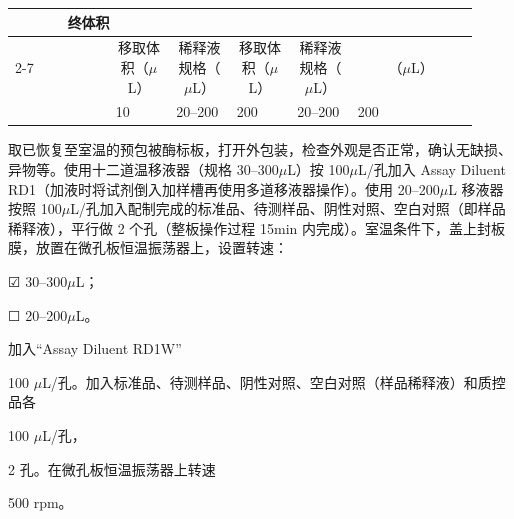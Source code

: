 \documentclass[UTF8,10pt,a4paper,fontset=fandol]{ctexart}
\newcommand{\fieldvalue}[1]{#1}
\newcommand{\handwritten}[1]{#1}
\newcommand{\checkboxfield}[1]{\ifstrequal{#1}{checked}{☑}{\ifstrequal{#1}{unclear}{?}{☐}}}
\begin{document}
\begin{tabular}{|p{0.20\linewidth}|p{0.12\linewidth}|p{0.12\linewidth}|p{0.12\linewidth}|p{0.12\linewidth}|p{0.12\linewidth}|p{0.12\linewidth}|}
\multicolumn{2}{c|}{终体积} \\
\cline{2-7}
 & \multicolumn{1}{c|}{移取体积（$\mu$L）} &
 \multicolumn{1}{c|}{稀释液规格（$\mu$L）} &
 \multicolumn{1}{c|}{移取体积（$\mu$L）} &
 \multicolumn{1}{c|}{稀释液规格（$\mu$L）} &
 \multicolumn{2}{c|}{（$\mu$L）} \\
\hline
 &
\fieldvalue{\handwritten{10}} &
\fieldvalue{\handwritten{20--200}} &
\fieldvalue{\handwritten{200}} &
\fieldvalue{\handwritten{20--200}} &
\fieldvalue{\handwritten{200}} &
\\
\hline
\end{tabular}

\vspace{2mm}

\noindent
取已恢复至室温的预包被酶标板，打开外包装，检查外观是否正常，确认无缺损、异物等。使用十二道温移液器（规格 30--300$\mu$L）按 100$\mu$L/孔加入 Assay Diluent RD1（加液时将试剂倒入加样槽再使用多道移液器操作）。使用 20--200$\mu$L 移液器按照 100$\mu$L/孔加入配制完成的标准品、待测样品、阴性对照、空白对照（即样品稀释液），平行做 2 个孔（整板操作过程 15min 内完成）。室温条件下，盖上封板膜，放置在微孔板恒温振荡器上，设置转速：

\fieldvalue{\checkboxfield{checked}} 30--300$\mu$L；

\fieldvalue{\checkboxfield{unchecked}} 20--200$\mu$L。

\vspace{1mm}

\noindent
加入“Assay Diluent RD1W”

\fieldvalue{\handwritten{100}} $\mu$L/孔。加入标准品、待测样品、阴性对照、空白对照（样品稀释液）和质控品各

\fieldvalue{\handwritten{100}} $\mu$L/孔，

\fieldvalue{\handwritten{2}} 孔。在微孔板恒温振荡器上转速

\fieldvalue{\handwritten{500}} rpm。
\end{document}
